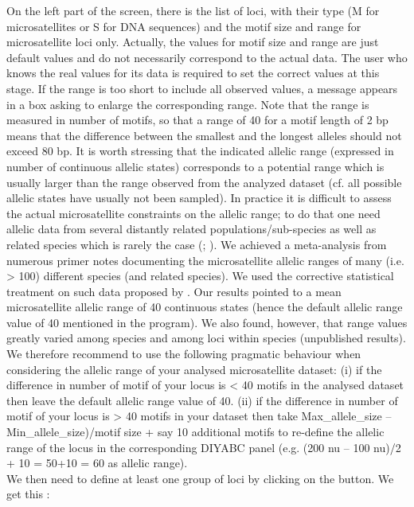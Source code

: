 On the left part of the screen, there is the list of loci, with their type (M for microsatellites or S for DNA sequences) and the motif size and range for microsatellite loci only. Actually, the values for motif size and range are just default values and do not necessarily correspond to the actual data. The user who knows the real values for its data is required to set the correct values at this stage. If the range is too short to include all observed values, a message appears in a box asking to enlarge the corresponding range. Note that the range is measured in number of motifs, so that a range of 40 for a motif length of 2 bp means that the difference between the smallest and the longest alleles should not exceed 80 bp. It is worth stressing that the indicated allelic range (expressed in number of continuous allelic states) corresponds to a potential range which is usually larger than the range observed from the analyzed dataset (cf. all possible allelic states have usually not been sampled). In practice it is difficult to assess the actual microsatellite constraints on the allelic range; to do that one need allelic data from several distantly related populations/sub-species as well as related species which is rarely the case (\citep[see][]{PDD1998}; \citep{E2002}). We achieved a meta-analysis from numerous primer notes documenting the microsatellite allelic ranges of many (i.e. > 100) different species (and related species). We used the corrective statistical treatment on such data proposed by \citep{PDD1998}. Our results pointed to a mean microsatellite allelic range of 40 continuous states (hence the default allelic range value of 40 mentioned in the program). We also found, however, that range values greatly varied among species and among loci within species (unpublished results). We therefore recommend to use the following pragmatic behaviour when considering the allelic range of your analysed microsatellite dataset: (i) if the difference in number of motif of your locus is < 40 motifs in the analysed dataset then leave the default allelic range value of 40. (ii) if the difference in number of motif of your locus is > 40 motifs in your dataset then take Max\_allele\_size – Min\_allele\_size)/motif size + say 10 additional motifs to re-define the allelic range of the locus in the corresponding DIYABC panel (e.g. (200 nu – 100 nu)/2 + 10 = 50+10 = 60 as allelic range).\\
We then need to define at least one group of loci by clicking on the  button. We get this :\\

